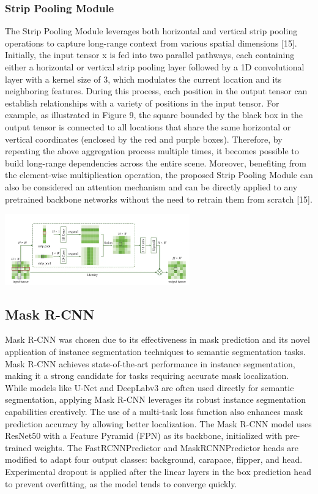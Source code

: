 \documentclass[conference]{IEEEtran}
\begin{document}
\subsubsection{Strip Pooling Module}
The Strip Pooling Module leverages both horizontal and vertical strip pooling operations to capture long-range context from various spatial dimensions [15]. Initially, the input tensor x is fed into two parallel pathways, each containing either a horizontal or vertical strip pooling layer followed by a 1D convolutional layer with a kernel size of 3, which modulates the current location and its neighboring features.
During this process, each position in the output tensor can establish relationships with a variety of positions in the input tensor. For example, as illustrated in Figure 9, the square bounded by the black box in the output tensor is connected to all locations that share the same horizontal or vertical coordinates (enclosed by the red and purple boxes). Therefore, by repeating the above aggregation process multiple times, it becomes possible to build long-range dependencies across the entire scene. Moreover, benefiting from the element-wise multiplication operation, the proposed Strip Pooling Module can also be considered an attention mechanism and can be directly applied to any pretrained backbone networks without the need to retrain them from scratch [15].
\centerline{\includegraphics[width=80mm]{group/Picture10.png}}
\subsection{Mask R-CNN}
Mask R-CNN was chosen due to its effectiveness in mask prediction and its novel application of instance segmentation techniques to semantic segmentation tasks. Mask R-CNN achieves state-of-the-art performance in instance segmentation, making it a strong candidate for tasks requiring accurate mask localization. While models like U-Net and DeepLabv3 are often used directly for semantic segmentation, applying Mask R-CNN leverages its robust instance segmentation capabilities creatively. The use of a multi-task loss function also enhances mask prediction accuracy by allowing better localization. 
The Mask R-CNN model uses ResNet50 with a Feature Pyramid (FPN) as its backbone, initialized with pre-trained weights. The FastRCNNPredictor and MaskRCNNPredictor heads are modified to adapt four output classes: background, carapace, flipper, and head. Experimental dropout is applied after the linear layers in the box prediction head to prevent overfitting, as the model tends to converge quickly.
\end{document}
